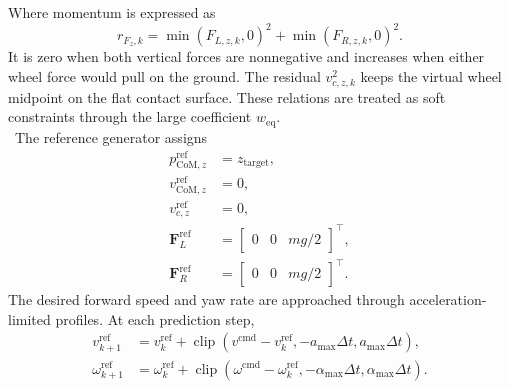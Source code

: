 %
Where momentum is expressed as 
%
\begin{equation}
    r_{F_z,k}
    =
    \min\left(F_{L,z,k},0\right)^2
    +
    \min\left(F_{R,z,k},0\right)^2.
    \label{eq:dfcip_unilateral_force}
\end{equation}
%
It is zero when both vertical forces are nonnegative and increases when either
wheel force would pull on the ground. The residual $v_{c,z,k}^{2}$ keeps the
virtual wheel midpoint on the flat contact surface. These relations are
treated as soft constraints through the large coefficient
$w_{\mathrm{eq}}$.\\
\
The reference generator assigns
%
\begin{equation}
\begin{aligned}
    p_{\mathrm{CoM},z}^{\mathrm{ref}}
        &= z_{\mathrm{target}}, \\
    v_{\mathrm{CoM},z}^{\mathrm{ref}}
        &= 0, \\
    v_{c,z}^{\mathrm{ref}}
        &= 0, \\
    \mathbf{F}_{L}^{\mathrm{ref}}
        &=
        \begin{bmatrix}
            0 & 0 & mg/2
        \end{bmatrix}^{\top}, \\
    \mathbf{F}_{R}^{\mathrm{ref}}
        &=
        \begin{bmatrix}
            0 & 0 & mg/2
        \end{bmatrix}^{\top}.
\end{aligned}
\label{eq:dfcip_nominal_references}
\end{equation}
%
The desired forward speed and yaw rate are approached through
acceleration-limited profiles. At each prediction step,
%
\begin{equation}
\begin{aligned}
    v_{k+1}^{\mathrm{ref}}
        &=
        v_k^{\mathrm{ref}}
        +
        \operatorname{clip}
        \left(
            v^{\mathrm{cmd}}-v_k^{\mathrm{ref}},
            -a_{\max}\Delta t,
            a_{\max}\Delta t
        \right), \\
    \omega_{k+1}^{\mathrm{ref}}
        &=
        \omega_k^{\mathrm{ref}}
        +
        \operatorname{clip}
        \left(
            \omega^{\mathrm{cmd}}-\omega_k^{\mathrm{ref}},
            -\alpha_{\max}\Delta t,
            \alpha_{\max}\Delta t
        \right).
\end{aligned}
\label{eq:dfcip_velocity_ramp}
\end{equation}
